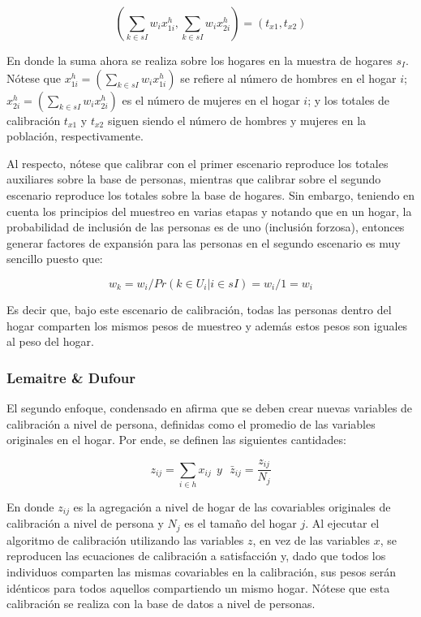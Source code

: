 \documentclass[
  10pt,
  spanish,
]{book}
\begin{document}
\[
\left ( \sum_{k \in sI} w_{i} x^h_{1i}, \sum_{k \in sI} w_{i} x^h_{2i}\right )=(t_{x1}, t_{x2})
\]

En donde la suma ahora se realiza sobre los hogares en la muestra de hogares \(s_I\). Nótese que \(x^h_{1i}=(\sum_{k \in sI} w_{i} x^h_{1i})\) se refiere al número de hombres en el hogar \(i\); \(x^h_{2i}=(\sum_{k \in sI} w_{i} x^h_{2i})\) es el número de mujeres en el hogar \(i\); y los totales de calibración \(t_{x1}\) y \(t_{x2}\) siguen siendo el número de hombres y mujeres en la población, respectivamente.

Al respecto, nótese que calibrar con el primer escenario reproduce los totales auxiliares sobre la base de personas, mientras que calibrar sobre el segundo escenario reproduce los totales sobre la base de hogares. Sin embargo, teniendo en cuenta los principios del muestreo en varias etapas y notando que en un hogar, la probabilidad de inclusión de las personas es de uno (inclusión forzosa), entonces generar factores de expansión para las personas en el segundo escenario es muy sencillo puesto que:

\[
w_k=w_i/Pr(k \in U_i | i \in sI) = w_i / 1 = w_i
\]

Es decir que, bajo este escenario de calibración, todas las personas dentro del hogar comparten los mismos pesos de muestreo y además estos pesos son iguales al peso del hogar.

\hypertarget{lemaitre-dufour}{%
\subsubsection*{Lemaitre \& Dufour}\label{lemaitre-dufour}}

El segundo enfoque, condensado en \citet{Lemaitre_Dufour_1987} afirma que se deben crear nuevas variables de calibración a nivel de persona, definidas como el promedio de las variables originales en el hogar. Por ende, se definen las siguientes cantidades:

\[
z_{ij}=\sum_{i\in h} x_{ij}\ \ y\ \ \ {\bar{z}}_{ij}=\frac{z_{ij}}{N_j}
\]

En donde \(z_{ij}\) es la agregación a nivel de hogar de las covariables originales de calibración a nivel de persona y \(N_j\) es el tamaño del hogar \(j\). Al ejecutar el algoritmo de calibración utilizando las variables \(z\), en vez de las variables \(x\), se reproducen las ecuaciones de calibración a satisfacción y, dado que todos los individuos comparten las mismas covariables en la calibración, sus pesos serán idénticos para todos aquellos compartiendo un mismo hogar. Nótese que esta calibración se realiza con la base de datos a nivel de personas.
\end{document}
